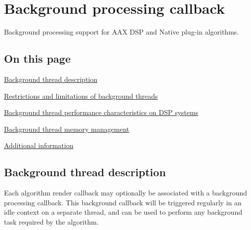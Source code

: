 \hypertarget{a00341}{}\section{Background processing callback}
\label{a00341}
Background processing support for A\+A\+X D\+S\+P and Native plug-\/in algorithms. 

\hypertarget{a00341_algbgpagecontents}{}\subsection{On this page}\label{a00341_algbgpagecontents}
\begin{DoxyItemize}
\item \hyperlink{a00341_alg_bg_desc}{Background thread description} \item \hyperlink{a00341_alg_bg_restrict}{Restrictions and limitations of background threads} \item \hyperlink{a00341_alg_bg_perf}{Background thread performance characteristics on D\+S\+P systems} \item \hyperlink{a00341_alg_bg_memmgmt}{Background thread memory management} \item \hyperlink{a00341_alg_bg_additionalinformation}{Additional information}\end{DoxyItemize}
\hypertarget{a00341_alg_bg_desc}{}\subsection{Background thread description}\label{a00341_alg_bg_desc}
Each algorithm render callback may optionally be associated with a background processing callback. This background callback will be triggered regularly in an idle context on a separate thread, and can be used to perform any background task required by the algorithm.

